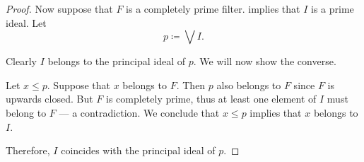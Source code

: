 \begin{proof}
  \NecessitySubProof* Now suppose that \( F \) is a completely prime filter.  implies that \( I \) is a prime ideal. Let
  \begin{equation*}
    p \coloneqq \bigvee I.
  \end{equation*}

  Clearly \( I \) belongs to the principal ideal of \( p \). We will now show the converse.

  Let \( x \leq p \). Suppose that \( x \) belongs to \( F \). Then \( p \) also belongs to \( F \) since \( F \) is upwards closed. But \( F \) is completely prime, thus at least one element of \( I \) must belong to \( F \) --- a contradiction. We conclude that \( x \leq p \) implies that \( x \) belongs to \( I \).

  Therefore, \( I \) coincides with the principal ideal of \( p \).
\end{proof}

